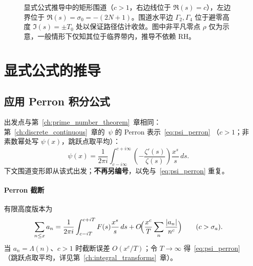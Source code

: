 \begin{figure}[htbp]
\caption{显式公式推导中的矩形围道（$c>1$，右边线位于 $\Re(s)=c$），左边界位于 $\Re(s) = \sigma_0 = -(2N+1)$。围道水平边 $\Gamma_2, \Gamma_4$ 位于避零高度 $\Im(s) = \pm T_0$ 处以保证路径估计收敛。图中非平凡零点 $\rho$ 仅为示意，一般情形下仅知其位于临界带内，推导不依赖 RH。}
\label{fig:contour}
\end{figure}

\section{显式公式的推导}\label{sec:explicit-derivation}

\subsection{应用 Perron 积分公式}

出发点与第~\ref{ch:prime_number_theorem}~章相同：第~\ref{ch:discrete_continuous}~章的~$\psi$ 的 Perron 表示~\eqref{eq:psi_perron}
（$c>1$；非素数幂处写 $\psi(x)$，跳跃点取平均）：
\[
\psi(x)=\frac{1}{2\pi i}\int_{c-i\infty}^{c+i\infty}\left(-\frac{\zeta'(s)}{\zeta(s)}\right)\frac{x^s}{s}\,ds.
\]
下文围道变形即从该式出发；\textbf{不再另编号}，以免与~\eqref{eq:psi_perron} 重复。

\paragraph{Perron 截断}
有限高度版本为
\[
\sum_{n\le x} a_n
=\frac{1}{2\pi i}\int_{c-iT}^{c+iT} F(s)\frac{x^s}{s}\,ds
+O\!\Bigl(\frac{x^c}{T}\sum_n\frac{|a_n|}{n^c}\Bigr)
\qquad(c>\sigma_a).
\]
当 $a_n=\Lambda(n)$、$c>1$ 时截断误差 $O(x^c/T)$；令 $T\to\infty$ 得~\eqref{eq:psi_perron}
（跳跃点取平均，详见第~\ref{ch:integral_transforms}~章）。

